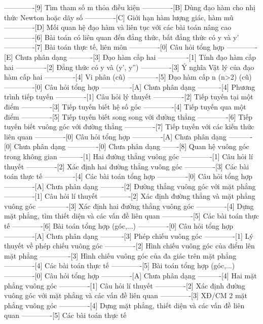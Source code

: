 -------------[9] Tìm tham số m thỏa điều kiện
-------------[B] Dùng đạo hàm cho nhị thức Newton hoặc dãy số
-------------[C] Giới hạn hàm lượng giác, hàm mũ
-------------[D] Mối quan hệ đạo hàm và liên tục với các bài toán nâng cao
-------------[6] Bài toán có liên quan đến đẳng thức, bất đẳng thức có y và y' 
-------------[7] Bài toán thực tế, liên môn
-------------[0] Câu hỏi tổng hợp
-------------[E] Chưa phân dạng
----------[3] Đạo hàm cấp hai
-------------[1] Tính đạo hàm cấp hai
-------------[2] Đẳng thức có y và (y', y'')
-------------[3] Ý nghĩa Vật lý của đạo hàm cấp hai
-------------[4] Vi phân (cũ)
-------------[5] Đạo hàm cấp n (n>2) (cũ)
-------------[0] Câu hỏi tổng hợp
-------------[A] Chưa phân dạng
----------[4] Phương trình tiếp tuyến
-------------[1] Câu hỏi lý thuyết
-------------[2] Tiếp tuyến tại một điểm
-------------[3] Tiếp tuyến biết hệ số góc
-------------[4] Tiếp tuyến qua một điểm 
-------------[5] Tiếp tuyến biết song song với đường thẳng
-------------[6] Tiếp tuyến biết vuông góc với đường thẳng
-------------[7] Tiếp tuyến với các kiến thức liên quan
-------------[0] Câu hỏi tổng hợp
-------------[A] Chưa phân dạng
----------[0] Chưa phân dạng
-------------[0] Chưa phân dạng
-------[8] Quan hệ vuông góc trong không gian
----------[1] Hai đường thẳng vuông góc
-------------[1] Câu hỏi lí thuyết
-------------[2] Xác định hai đường thẳng vuông góc
-------------[3] Các bài toán thực tế
-------------[4] Các bài toán tổng hợp 
-------------[0] Câu hỏi tổng hợp
-------------[A] Chưa phân dạng
----------[2] Đường thẳng vuông góc với mặt phẳng
-------------[1] Câu hỏi lí thuyết
-------------[2] Xác định đường thẳng và mặt phẳng vuông góc
-------------[3] Xác định hai đường thẳng vuông góc
-------------[4] Dựng mặt phẳng, tìm thiết diện và các vấn đề liên quan
-------------[5] Các bài toán thực tế
-------------[6] Bài toán tổng hợp (góc,...)
-------------[0] Câu hỏi tổng hợp
-------------[A] Chưa phân dạng
----------[3] Phép chiếu vuông góc
-------------[1] Lý thuyết về phép chiếu vuông góc
-------------[2] Hình chiếu vuông góc của điểm lên mặt phẳng
-------------[3] Hình chiếu vuông góc của đa giác trên mặt phẳng
-------------[4] Các bài toán thực tế
-------------[5] Bài toán tổng hợp (góc,...)
-------------[0] Câu hỏi tổng hợp
-------------[A] Chưa phân dạng
----------[4] Hai mặt phẳng vuông góc
-------------[1] Câu hỏi lí thuyết
-------------[2] Xác định đường vuông góc với mặt phẳng và các vấn đề liên quan
-------------[3] XĐ/CM 2 mặt phẳng vuông góc
-------------[4] Dựng mặt phẳng, thiết diện và các vấn đề liên quan
-------------[5] Các bài toán thực tế
